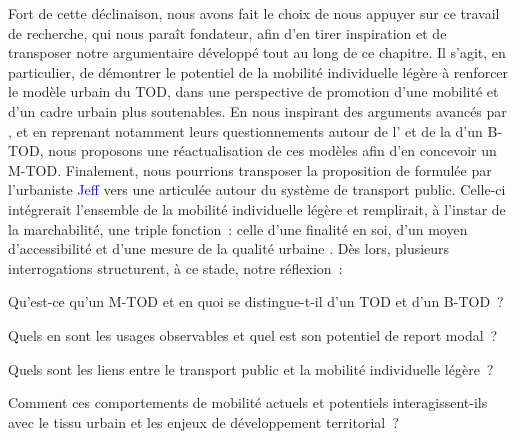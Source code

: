 \begin{refsegment}
Fort de cette déclinaison, nous avons fait le choix de nous appuyer sur ce travail de recherche, qui nous paraît fondateur, afin d’en tirer inspiration et de transposer notre argumentaire développé tout au long de ce chapitre. Il s’agit, en particulier, de démontrer le potentiel de la mobilité individuelle légère à renforcer le modèle urbain du \acrshort{TOD}, dans une perspective de promotion d’une mobilité et d’un cadre urbain plus soutenables. En nous inspirant des arguments avancés par \textcolor{blue}{\textcite{lee_bicycle-based_2016}}, et en reprenant notamment leurs questionnements autour de l’ et de la  d’un \acrshort{B-TOD}, nous proposons une réactualisation de ces modèles afin d’en concevoir un \acrfull{M-TOD}. Finalement, nous pourrions transposer la proposition de  formulée par l’urbaniste \textcolor{blue}{Jeff} \textcolor{blue}{\textcite[73]{speck_walkable_2013}} vers une  articulée autour du système de transport public. Celle-ci intégrerait l’ensemble de la mobilité individuelle légère et remplirait, à l’instar de la marchabilité, une triple fonction~: celle d’une finalité en soi, d’un moyen d’accessibilité et d’une mesure de la qualité urbaine \textcolor{blue}{\autocite[73]{speck_walkable_2013}}. Dès lors, plusieurs interrogations structurent, à ce stade, notre réflexion~:
    \begin{customitemize}
\item Qu’est-ce qu’un \acrshort{M-TOD} et en quoi se distingue-t-il d’un \acrshort{TOD} et d’un \acrshort{B-TOD}~?
\item Quels en sont les usages observables et quel est son potentiel de report modal~?
\item Quels sont les liens entre le transport public et la mobilité individuelle légère~?
\item Comment ces comportements de mobilité actuels et potentiels interagissent-ils avec le tissu urbain et les enjeux de développement territorial~?
    \end{customitemize}%

    \newpage

\end{refsegment}
